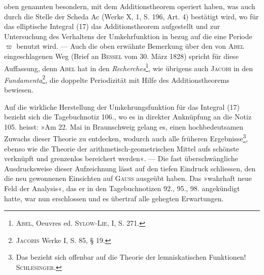 oben genannten besondern, mit dem Additionstheorem operiert haben, was
auch durch die Stelle der Scheda Ac (Werke X, 1, S. 196, Art. 4) bestätigt
wird, wo für das elliptische Integral (17) das Additionstheorem aufgestellt
und zur Untersuchung des Verhaltens der Umkehrfunktion in bezug auf die
eine Periode \(\varpi\) benutzt wird. — Auch die oben erwähnte Bemerkung über
den von \textsc{Abel} eingeschlagenen Weg (Brief an \textsc{Bessel} vom 30. März 1828)
spricht für diese Auffassung, denn \textsc{Abel} hat in den \textit{Recherches}\footnote{\textsc{Abel}, Oeuvres ed. \textsc{Sylow-Lie}, I, S. 271.}, wie übrigens
auch \textsc{Jacobi} in den \textit{Fundamenta}\footnote{\textsc{Jacobis} Werke I, S. 85, § 19.}, die doppelte Periodizität mit Hilfe des
Additionstheorems bewiesen.

Auf die wirkliche Herstellung der Umkehrungsfunktion für das Integral
(17) bezieht sich die Tagebuchnotiz 106., wo es in direkter Anknüpfung an
die Notiz 105. heisst: »Am 22. Mai in Braunschweig gelang es, einen hochbedeutsamen Zuwachs dieser Theorie zu entdecken, wodurch auch alle früheren
Ergebnisse\footnote{Das bezieht sich offenbar auf die Theorie der lemniskatischen Funktionen! \textsc{Schlesinger}.}, ebenso wie die Theorie der arithmetisch-geometrischen Mittel
aufs schönste verknüpft und grenzenlos bereichert werden«. — Die fast überschwängliche Ausdrucksweise dieser Aufzeichnung lässt auf den tiefen Eindruck
schliessen, den die neu gewonnenen Einsichten auf \textsc{Gauss} ausgeübt haben.
Das »wahrhaft neue Feld der Analysis«, das er in den Tagebuchnotizen 92.,
95., 98. angekündigt hatte, war nun erschlossen und es übertraf alle gehegten
Erwartungen.

